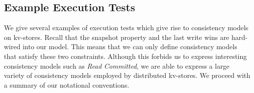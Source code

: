 % 
%


\subsection{Example Execution Tests}
\label{subsec:cm_examples}
We give several examples of execution tests which give rise to consistency
models on kv-stores.
Recall that the snapshot property and the last write wins are hard-wired into our model. 
This means that we can only define  consistency models that satisfy these two constraints. 
Although this forbids us to express interesting consistency models such as \emph{Read Committed}, we are able to express a large variety of consistency models employed by distributed kv-stores.
We proceed with a summary of our notational conventions.


